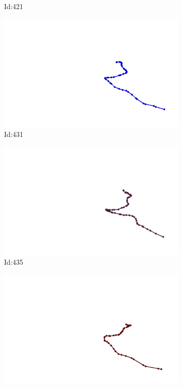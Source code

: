 \documentclass[12pt,twoside]{report}
\begin{document}
\begin{figure}
\begin{subfigure}[b]{0.20\textwidth}
\caption{Id:421}
\end{subfigure}
\begin{subfigure}[b]{0.20\textwidth}
\centering
\includegraphics[width=\textwidth]{../trajectories/431.png}
\caption{Id:431}
\end{subfigure}
\begin{subfigure}[b]{0.20\textwidth}
\centering
\includegraphics[width=\textwidth]{../trajectories/435.png}
\caption{Id:435}
\end{subfigure}
\begin{subfigure}[b]{0.20\textwidth}
\centering
\includegraphics[width=\textwidth]{../trajectories/446.png}

\end{subfigure}
\end{figure}
\end{document}
